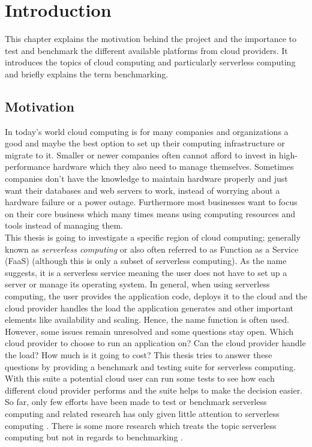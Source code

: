 \chapter{Introduction}
This chapter explains the motivation behind the project and the importance to test and benchmark the different available platforms from cloud providers. It introduces the topics of cloud computing and particularly serverless computing and briefly explains the term benchmarking.
\section{Motivation}
In today's world cloud computing is for many companies and organizations a good and maybe the best option to set up their computing infrastructure or migrate to it. Smaller or newer companies often cannot afford to invest in high-performance hardware which they also need to manage themselves. Sometimes companies don't have the knowledge to maintain hardware properly and just want their databases and web servers to work, instead of worrying about a hardware failure or a power outage. Furthermore most businesses want to focus on their core business which many times means using computing resources and tools instead of managing them.\\
This thesis is going to investigate a specific region of cloud computing; generally known as \textit{serverless computing} or also often referred to as Function as a Service (\gls{FaaS}) (although this is only a subset of serverless computing). As the name suggests, it is a serverless service meaning the user does not have to set up a server or manage its operating system. In general, when using serverless computing, the user provides the application code, deploys it to the cloud and the cloud provider handles the load the application generates and other important elements like availability and scaling. Hence, the name function is often used.\\
However, some issues remain unresolved and some questions stay open. Which cloud provider to choose to run an application on? Can the cloud provider handle the load? How much is it going to cost? This thesis tries to answer these questions by providing a benchmark and testing suite for serverless computing. With this suite a potential cloud user can run some tests to see how each different cloud provider performs and the suite helps to make the decision easier.\\
So far, only few efforts have been made to test or benchmark serverless computing \cite{doi:10.1002/cpe.4792, Kuntsevich:2018:DAB:3284014.3284016, EoPSCE, 10.1007/978-3-319-75178-8_34} and related research has only given little attention to serverless computing \cite{Gan:2019:OBS:3297858.3304013}. There is some more research which treats the topic serverless computing but not in regards to benchmarking \cite{Baldini2017, riseofserverless, vanEyk:2017:SCG:3154847.3154848}.
